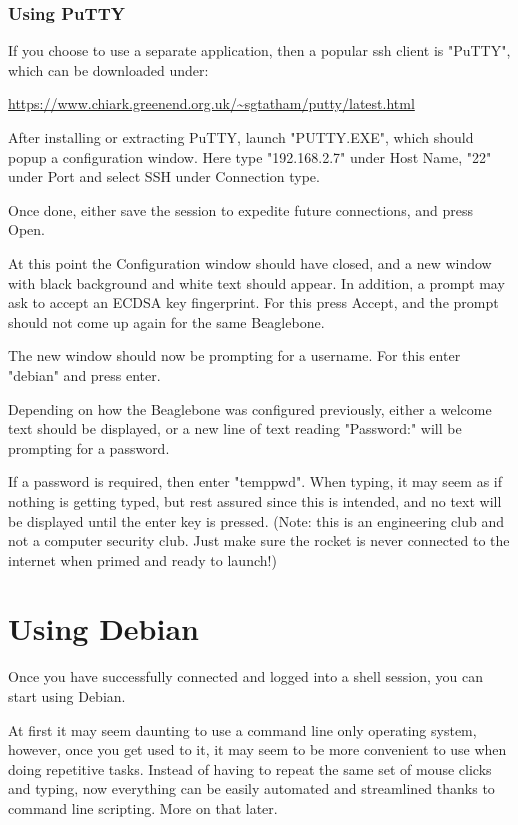 \documentclass[12pt,article]{memoir}
\begin{document}
\subsubsection{Using PuTTY}
If you choose to use a separate application, then a popular ssh client is "PuTTY", which can be downloaded under:\par
\url{https://www.chiark.greenend.org.uk/~sgtatham/putty/latest.html}\par
After installing or extracting PuTTY, launch "PUTTY.EXE", which should popup a configuration window. Here type "192.168.2.7" under Host Name, "22" under Port and select SSH under Connection type.\par
Once done, either save the session to expedite future connections, and press Open.\par
At this point the Configuration window should have closed, and a new window with black background and white text should appear. In addition, a prompt may ask to accept an ECDSA key fingerprint. For this press Accept, and the prompt should not come up again for the same Beaglebone.\par
The new window should now be prompting for a username. For this enter "debian" and press enter.\par
Depending on how the Beaglebone was configured previously, either a welcome text should be displayed, or a new line of text reading "Password:" will be prompting for a password.\par
If a password is required, then enter "temppwd". When typing, it may seem as if nothing is getting typed, but rest assured since this is intended, and no text will be displayed until the enter key is pressed. (Note: this is an engineering club and not a computer security club. Just make sure the rocket is never connected to the internet when primed and ready to launch!)

\newpage
\section{Using Debian}
Once you have successfully connected and logged into a shell session, you can start using Debian.\par
At first it may seem daunting to use a command line only operating system, however, once you get used to it, it may seem to be more convenient to use when doing repetitive tasks. Instead of having to repeat the same set of mouse clicks and typing, now everything can be easily automated and streamlined thanks to command line scripting. More on that later.
\end{document}
